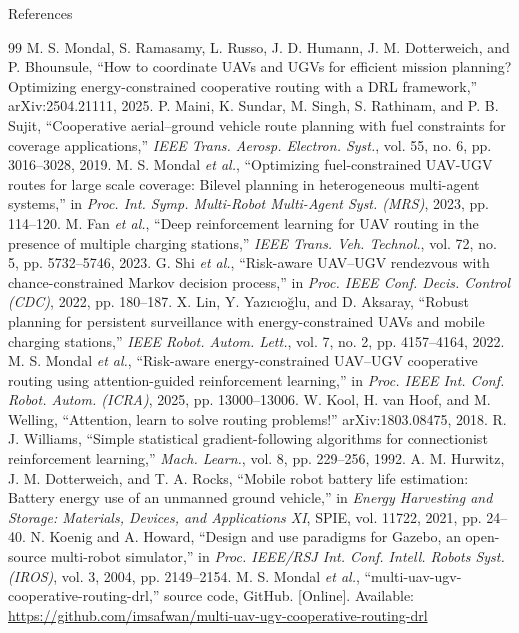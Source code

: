 \begin{frame}{References}
\fontsize{5.7}{6.7}\selectfont\setlength{\itemsep}{0.5pt}
\begin{thebibliography}{99}
 M. S. Mondal, S. Ramasamy, L. Russo, J. D. Humann, J. M. Dotterweich, and P. Bhounsule, ``How to coordinate UAVs and UGVs for efficient mission planning? Optimizing energy-constrained cooperative routing with a DRL framework,'' arXiv:2504.21111, 2025.
 P. Maini, K. Sundar, M. Singh, S. Rathinam, and P. B. Sujit, ``Cooperative aerial--ground vehicle route planning with fuel constraints for coverage applications,'' \emph{IEEE Trans. Aerosp. Electron. Syst.}, vol. 55, no. 6, pp. 3016--3028, 2019.
 M. S. Mondal \emph{et al.}, ``Optimizing fuel-constrained UAV-UGV routes for large scale coverage: Bilevel planning in heterogeneous multi-agent systems,'' in \emph{Proc. Int. Symp. Multi-Robot Multi-Agent Syst. (MRS)}, 2023, pp. 114--120.
 M. Fan \emph{et al.}, ``Deep reinforcement learning for UAV routing in the presence of multiple charging stations,'' \emph{IEEE Trans. Veh. Technol.}, vol. 72, no. 5, pp. 5732--5746, 2023.
 G. Shi \emph{et al.}, ``Risk-aware UAV--UGV rendezvous with chance-constrained Markov decision process,'' in \emph{Proc. IEEE Conf. Decis. Control (CDC)}, 2022, pp. 180--187.
 X. Lin, Y. Yaz{\i}c{\i}o\u{g}lu, and D. Aksaray, ``Robust planning for persistent surveillance with energy-constrained UAVs and mobile charging stations,'' \emph{IEEE Robot. Autom. Lett.}, vol. 7, no. 2, pp. 4157--4164, 2022.
 M. S. Mondal \emph{et al.}, ``Risk-aware energy-constrained UAV--UGV cooperative routing using attention-guided reinforcement learning,'' in \emph{Proc. IEEE Int. Conf. Robot. Autom. (ICRA)}, 2025, pp. 13000--13006.
 W. Kool, H. van Hoof, and M. Welling, ``Attention, learn to solve routing problems!'' arXiv:1803.08475, 2018.
 R. J. Williams, ``Simple statistical gradient-following algorithms for connectionist reinforcement learning,'' \emph{Mach. Learn.}, vol. 8, pp. 229--256, 1992.
 A. M. Hurwitz, J. M. Dotterweich, and T. A. Rocks, ``Mobile robot battery life estimation: Battery energy use of an unmanned ground vehicle,'' in \emph{Energy Harvesting and Storage: Materials, Devices, and Applications XI}, SPIE, vol. 11722, 2021, pp. 24--40.
 N. Koenig and A. Howard, ``Design and use paradigms for Gazebo, an open-source multi-robot simulator,'' in \emph{Proc. IEEE/RSJ Int. Conf. Intell. Robots Syst. (IROS)}, vol. 3, 2004, pp. 2149--2154.
 M. S. Mondal \emph{et al.}, ``multi-uav-ugv-cooperative-routing-drl,'' source code, GitHub. [Online]. Available: \url{https://github.com/imsafwan/multi-uav-ugv-cooperative-routing-drl}
\end{thebibliography}
\end{frame}



